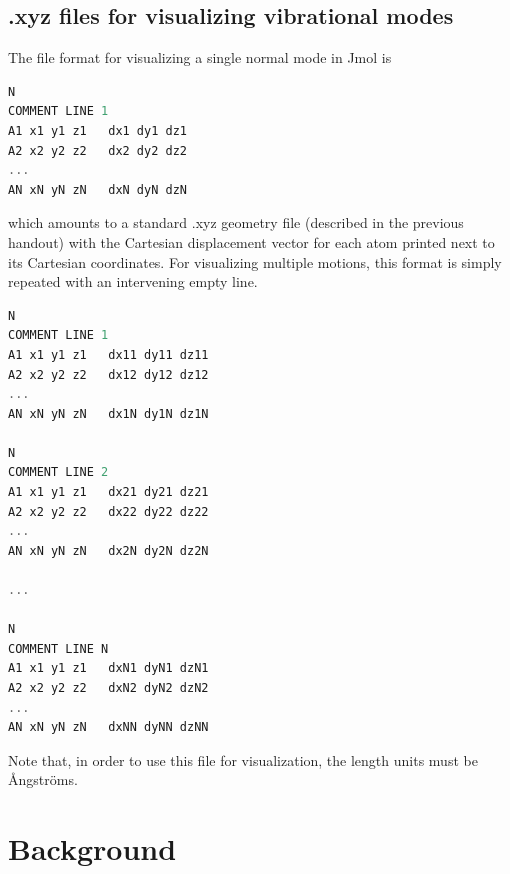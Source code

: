 \documentclass[11pt]{article}
\newcommand{\ttf}[1]{{\ttfamily #1}}
\begin{document}
\subsection{\ttf{.xyz} files for visualizing vibrational modes}
The file format for visualizing a single normal mode in Jmol is
\begin{addmargin}{5cm}{}
\begin{lstlisting}[language=c++]
N
COMMENT LINE 1
A1 x1 y1 z1   dx1 dy1 dz1
A2 x2 y2 z2   dx2 dy2 dz2
...                        
AN xN yN zN   dxN dyN dzN
\end{lstlisting}
\end{addmargin}
which amounts to a standard \ttf{.xyz} geometry file (described in the previous handout) with the Cartesian displacement vector for each atom printed next to its Cartesian coordinates.
For visualizing multiple motions, this format is simply repeated with an intervening empty line.
\begin{addmargin}{5cm}{}
\begin{lstlisting}[language=c++]
N
COMMENT LINE 1
A1 x1 y1 z1   dx11 dy11 dz11
A2 x2 y2 z2   dx12 dy12 dz12
...                        
AN xN yN zN   dx1N dy1N dz1N
                           
N                          
COMMENT LINE 2             
A1 x1 y1 z1   dx21 dy21 dz21
A2 x2 y2 z2   dx22 dy22 dz22
...                        
AN xN yN zN   dx2N dy2N dz2N
                           
...                        
                           
N                          
COMMENT LINE N             
A1 x1 y1 z1   dxN1 dyN1 dzN1
A2 x2 y2 z2   dxN2 dyN2 dzN2
...                        
AN xN yN zN   dxNN dyNN dzNN
\end{lstlisting}
\end{addmargin}
Note that, in order to use this file for visualization, the length units must be \AA ngstr\"oms.

\newpage
\section{Background}\label{background}
\end{document}
